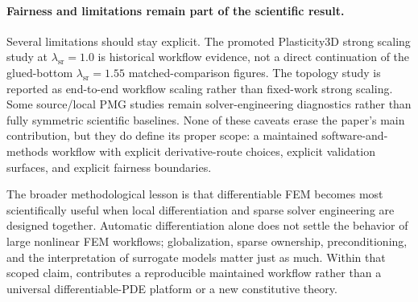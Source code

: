 \paragraph{Fairness and limitations remain part of the scientific result.}
Several limitations should stay explicit. The promoted Plasticity3D strong
scaling study at $\lambda_{\mathrm{sr}}=1.0$ is historical workflow
evidence, not a direct continuation of the glued-bottom
$\lambda_{\mathrm{sr}}=1.55$ matched-comparison figures. The topology study is
reported as end-to-end workflow scaling rather than fixed-work strong scaling.
Some source/local PMG studies remain solver-engineering diagnostics rather than
fully symmetric scientific baselines. None of these caveats erase the paper's
main contribution, but they do define its proper scope: a maintained
software-and-methods workflow with explicit derivative-route choices, explicit
validation surfaces, and explicit fairness boundaries.

The broader methodological lesson is that differentiable FEM becomes most
scientifically useful when local differentiation and sparse solver engineering
are designed together. Automatic differentiation alone does not settle the
behavior of large nonlinear FEM workflows; globalization, sparse ownership,
preconditioning, and the interpretation of surrogate models matter just as
much. Within that scoped claim, \repo{} contributes a reproducible maintained
workflow rather than a universal differentiable-PDE platform or a new
constitutive theory.
